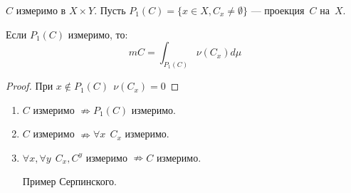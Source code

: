 \begin{corollary}
    \(C\) измеримо в \(X \times Y\). Пусть \(P_1(C) = \{x\in X, C_x \neq \emptyset\}\) --- проекция~\(C\) на~\(X\).

    Если \(P_1(C)\) измеримо, то:
    \[mC = \int_{P_1(C)} \nu(C_x) d\mu\]
\end{corollary}
\begin{proof}
    При \(x\notin P_1(C) \ \ \nu(C_x) = 0\)
\end{proof}

\begin{remark}\itemfix
    \begin{enumerate}
        \item \(C\) измеримо \(\nRightarrow P_1(C)\) измеримо.
        \item \(C\) измеримо \(\nRightarrow \forall x \ \ C_x\) измеримо.
        \item \(\forall x, \forall y \ \ C_x, C^y\) измеримо \(\nRightarrow C\) измеримо.

              Пример Серпинского.
    \end{enumerate}
\end{remark}
